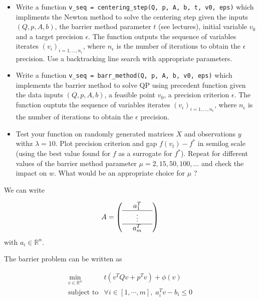 \documentclass[11pt]{article}
\providecommand{\tightlist}{%
      \setlength{\itemsep}{0pt}\setlength{\parskip}{0pt}}
\begin{document}
\begin{itemize}
\tightlist
\item
  Write a function
  \texttt{v\_seq\ =\ centering\_step(Q,\ p,\ A,\ b,\ t,\ v0,\ eps)}
  which impliments the Newton method to solve the centering step given
  the inputs \((Q, p, A, b)\), the barrier method parameter \(t\) (see
  lectures), initial variable \(v_0\) and a target precision
  \(\epsilon\). The function outputs the sequence of variables iterates
  \((v_i)_{i=1, \ldots, n_{\epsilon}}\), where \(n_{\epsilon}\) is the
  number of iterations to obtain the \(\epsilon\) precision. Use a
  backtracking line search with appropriate parameters.
\item
  Write a function
  \texttt{v\_seq\ =\ barr\_method(Q,\ p,\ A,\ b,\ v0,\ eps)} which
  implements the barrier method to solve QP using precedent function
  given the data inputs \((Q, p, A, b)\), a feasible point \(v_0\), a
  precision criterion \(\epsilon\). The function ouptuts the sequence of
  variables iterates \((v_i)_{i=1, \ldots, n_{\epsilon}}\), where
  \(n_{\epsilon}\) is the number of iterations to obtain the
  \(\epsilon\) precision.
\item
  Test your function on randomly generated matrices \(X\) and
  observations \(y\) withz \(\lambda = 10\). Plot precision criterion
  and gap \(f(v_t) - f^*\) in semilog scale (using the best value found
  for \(f\) as a surrogate for \(f^*\)). Repeat for different values of
  the barrier method parameter \(\mu = 2, 15, 50, 100, \ldots\) and
  check the impact on \(w\). What would be an appropriate choice for
  \(\mu\) ?
\end{itemize}

    We can write

\[
A = \left(\begin{array}{ccc}
& a_1^T & \\
\hline
& \vdots & \\
\hline
& a_m^T &
\end{array}\right)
\] with \(a_i \in \mathbb{R}^n\).

The barrier problem can be written as

\begin{equation}
\tag{Barrier}

\begin{array}{ll}
\displaystyle \min_{v \in \mathbb{R}^n} & t (v^T Q v + p^T v) + \phi(v) \\
\text{subject to} & \forall i \in [1, \cdots, m], \; a_i^T v - b_i \le 0
\end{array}

\end{equation}
\end{document}
